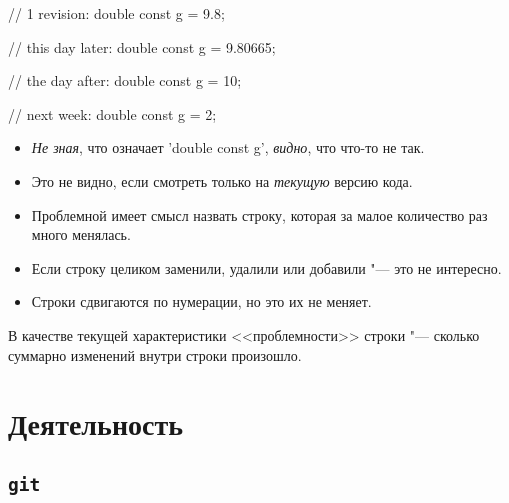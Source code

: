 \documentclass{beamer}
\makeatletter
\newcommand*{\currentname}{\@currentlabelname}
\def\t{\texttt}
\makeatother
\begin{document}
\begin{frame}[t,fragile]{\currentname}
	\begin{cppcode}
		// 1 revision:
		double const g = 9.8;
	\end{cppcode}
	\begin{cppcode}
		// this day later:
		double const g = 9.80665;
	\end{cppcode}
	\begin{cppcode}
		// the day after:
		double const g = 10;
	\end{cppcode}
	\begin{cppcode}
		// next week:
		double const g = 2;
	\end{cppcode}
	\begin{itemize}
	\item<2->
		\textit{Не зная}, что означает \cpp'double const g', \textit{видно}, что что-то не так.
	\item<3->
		Это не видно, если смотреть только на \textit{текущую} версию кода.
	\end{itemize}
\end{frame}

\begin{frame}[t]{\currentname}
	\begin{itemize}
	\item<1->
		Проблемной имеет смысл назвать строку, которая за малое количество раз много менялась.
	\item<2->
		Если строку целиком заменили, удалили или добавили "--- это не интересно.
	\item<3->
		Строки сдвигаются по нумерации, но это их не меняет.
	\end{itemize}
	\pause[4]
	В качестве текущей характеристики <<проблемности>> строки "--- сколько суммарно изменений внутри строки произошло.
\end{frame}

\section{Деятельность}

\subsection{\t{git}}
\end{document}
